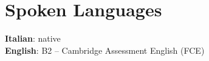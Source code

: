 \section{\textbf{Spoken Languages}}
 \begin{itemize}[leftmargin=0.05in, label={}]
    \small{\item{
     \textbf{Italian}{: native } \\
     \textbf{English}{: B2 -- Cambridge Assessment English (FCE) } \\
    }}
 \end{itemize}